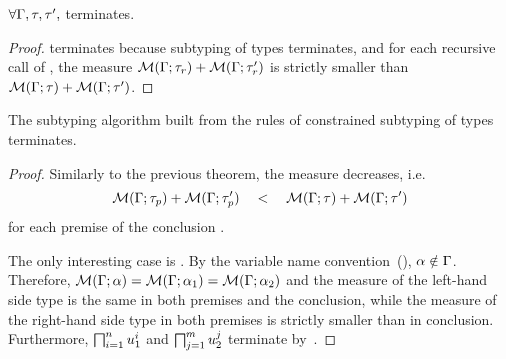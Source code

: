 
\begin{lemma}%
\label{lem:meet-terminates}
    $\forall \Gamma, \tau, \tau',$
     terminates.
\end{lemma}
\begin{proof}
     terminates because subtyping of types terminates,
    and for each recursive call  of 
    , the measure $\operatorname{\mathcal{M}}(\Gamma;\tau_r) + \operatorname{\mathcal{M}}(\Gamma;\tau'_r)$ 
    is strictly smaller than $\operatorname{\mathcal{M}}(\Gamma;\tau) + \operatorname{\mathcal{M}}(\Gamma;\tau')$.
\end{proof}

\begin{theorem}%
\label{thm:subtyctr-terminates}
    The subtyping algorithm built from the rules of
    constrained subtyping of types
     terminates.
\end{theorem}
\begin{proof}
    Similarly to the previous theorem, the measure decreases, i.e.
    \[\operatorname{\mathcal{M}}(\Gamma;\tau_p) + \operatorname{\mathcal{M}}(\Gamma;\tau'_p) \quad<\quad 
    \operatorname{\mathcal{M}}(\Gamma;\tau) + \operatorname{\mathcal{M}}(\Gamma;\tau')\]
    for each premise 
    of the conclusion .
    
    The only interesting case is .
    By the variable name convention~(), $\alpha \notin \Gamma$.
    Therefore, $\operatorname{\mathcal{M}}(\Gamma;\alpha) = \operatorname{\mathcal{M}}(\Gamma;\alpha_1) = \operatorname{\mathcal{M}}(\Gamma;\alpha_2)$
    and the measure of the left-hand side type is the same in both premises
    and the conclusion,
    while the measure of the right-hand side type in both premises 
    is strictly smaller than in conclusion.
    Furthermore, $\textstyle\bigsqcap_{i=1}^n u_1^i$ and $\textstyle\bigsqcap_{j=1}^m u_2^j$
    terminate by~.
\end{proof}

